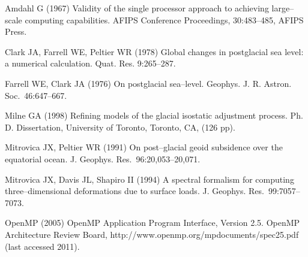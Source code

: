 \documentclass[11pt,fleqn,a4paper,titlepage]{article}
\newcommand\jgr{J. Geophys. Res.~}
\newcommand\gjras{Geophys. J. R. Astron. Soc.~}
\newcommand\gji{Geophys. J. Int.~}
\begin{document}
\begin{thebibliography}{99}

Amdahl G (1967) 
Validity of the single processor approach to achieving large--scale computing capabilities.
AFIPS Conference Proceedings, 30:483--485, AFIPS Press.

Clark JA, Farrell WE, Peltier WR (1978) 
Global changes in postglacial sea level: a numerical calculation.  
Quat. Res. 9:265--287. 


Farrell WE, Clark JA (1976) 
On postglacial sea--level. 
\gjras 46:647--667. 

Milne GA (1998) 
Refining models of the glacial isostatic adjustment process.
Ph. D. Dissertation, University of Toronto, Toronto, CA, (126 pp). 




Mitrovica JX, Peltier WR (1991) 
On post--glacial geoid subsidence over the equatorial ocean. 
\jgr 96:20,053--20,071.

Mitrovica JX, Davis JL, Shapiro II (1994) 
A spectral formalism for computing three--dimensional deformations due to surface loads. 
\jgr 99:7057--7073.

OpenMP (2005) 
OpenMP Application Program Interface, Version 2.5. OpenMP Architecture Review Board, 
http://www.openmp.org/mpdocuments/spec25.pdf (last accessed 2011). 


\end{thebibliography}
\end{document}
